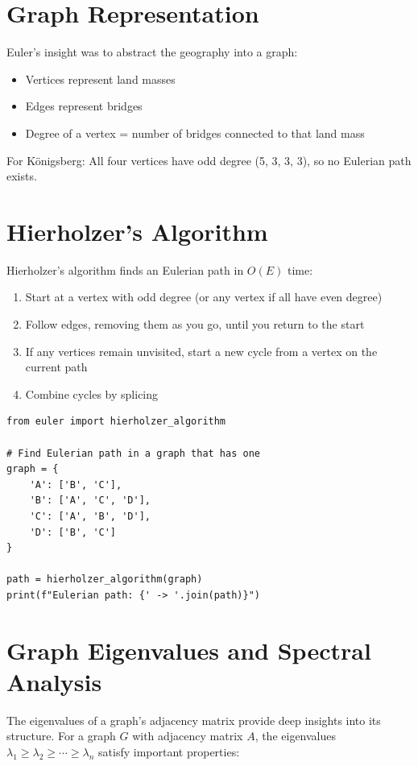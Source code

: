 \section{Graph Representation}

Euler's insight was to abstract the geography into a graph:
\begin{itemize}
\item Vertices represent land masses
\item Edges represent bridges
\item Degree of a vertex = number of bridges connected to that land mass
\end{itemize}

For K\"{o}nigsberg: All four vertices have odd degree (5, 3, 3, 3), so no Eulerian path exists.

\section{Hierholzer's Algorithm}

Hierholzer's algorithm finds an Eulerian path in $O(E)$ time:

\begin{enumerate}
\item Start at a vertex with odd degree (or any vertex if all have even degree)
\item Follow edges, removing them as you go, until you return to the start
\item If any vertices remain unvisited, start a new cycle from a vertex on the current path
\item Combine cycles by splicing
\end{enumerate}

\begin{lstlisting}[caption={Hierholzer's algorithm}, label=lst:hierholzer]
from euler import hierholzer_algorithm

# Find Eulerian path in a graph that has one
graph = {
    'A': ['B', 'C'],
    'B': ['A', 'C', 'D'],
    'C': ['A', 'B', 'D'],
    'D': ['B', 'C']
}

path = hierholzer_algorithm(graph)
print(f"Eulerian path: {' -> '.join(path)}")
\end{lstlisting}

\section{Graph Eigenvalues and Spectral Analysis}

The eigenvalues of a graph's adjacency matrix provide deep insights into its structure.
For a graph $G$ with adjacency matrix $A$, the eigenvalues $\lambda_1 \geq \lambda_2 \geq \cdots \geq \lambda_n$
satisfy important properties:

